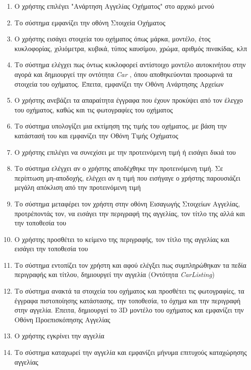 \documentclass{../ol-softwaremanual}
\begin{document}
	\begin{enumerate}
		
		\item Ο χρήστης επιλέγει \en"\gr Ανάρτηση Αγγελίας Οχήματος\en" \gr στο αρχικό μενού
		\item Το σύστημα εμφανίζει την οθόνη Στοιχεία Οχήματος
		\item Ο χρήστης εισάγει στοιχεία του οχήματος όπως μάρκα, μοντέλο, έτος κυκλοφορίας, χιλιόμετρα, κυβικά, τύπος καυσίμου, χρώμα, αριθμός πινακίδας, κλπ
		\item Το σύστημα ελέγχει πως όντως κυκλοφορεί αντίστοιχο μοντέλο αυτοκινήτου στην αγορά και δημιουργεί την οντότητα \en \textit{Car} \gr, όπου αποθηκεύονται προσωρινά τα στοιχεία του οχήματος. Έπειτα, εμφανίζει την Οθόνη Ανάρτησης Αρχείων
		\item Ο χρήστης ανεβάζει τα απαραίτητα έγγραφα που έχουν προκύψει από τον έλεγχο του οχήματος, καθώς και τις φωτογραφίες του οχήματος
		\item Το σύστημα υπολογίζει μια εκτίμηση της τιμής του οχήματος, με βάση την κατάστασή του και εμφανίζει την Οθόνη Τιμής Οχήματος
		\item Ο χρήστης επιλέγει να συνεχίσει με την προτεινόμενη τιμή ή εισάγει δικιά του
		\item Το σύστημα ελέγχει αν ο χρήστης αποδέχθηκε την προτεινόμενη τιμή. Σε περίπτωση μη-αποδοχής, ελέγχει αν η τιμή που εισήγαγε ο χρήστης παρουσιάζει μεγάλη απόκλιση από την προτεινόμενη τιμή
		\item Το σύστημα μεταφέρει τον χρήστη στην οθόνη Εισαγωγής Στοιχείων Αγγελίας, προτρέποντάς τον, να εισάγει την περιγραφή της αγγελίας, τον τίτλο της αλλά και την τοποθεσία του
		\item Ο χρήστης προσθέτει το κείμενο της περιγραφής, τον τίτλο της αγγελίας και εισάγει την τοποθεσία του
		\item Το σύστημα εντοπίζει τον χρήστη και αφού ελέγξει πως συμπληρώθηκαν τα πεδία περιγραφής και τίτλου, δημιουργεί την αγγελία (Οντότητα \en \textit{CarListing}\gr)
		\item Το σύστημα ανακτά τα στοιχεία του οχήματος και προσθέτει τις φωτογραφίες, τα έγγραφα πιστοποίησης κατάστασης, την τοποθεσία, το όχημα και την περιγραφή στην αγγελία. Έπειτα, δημιουργεί το  \en 3D \gr μοντέλο του οχήματος και εμφανίζει την Οθόνη Προεπισκόπησης Αγγελίας
		\item Ο χρήστης εγκρίνει την αγγελία
		\item Το σύστημα καταχωρεί την αγγελία και εμφανίζει μήνυμα επιτυχούς καταχώρησης αγγελίας
	\end{enumerate}
	
\end{document}
